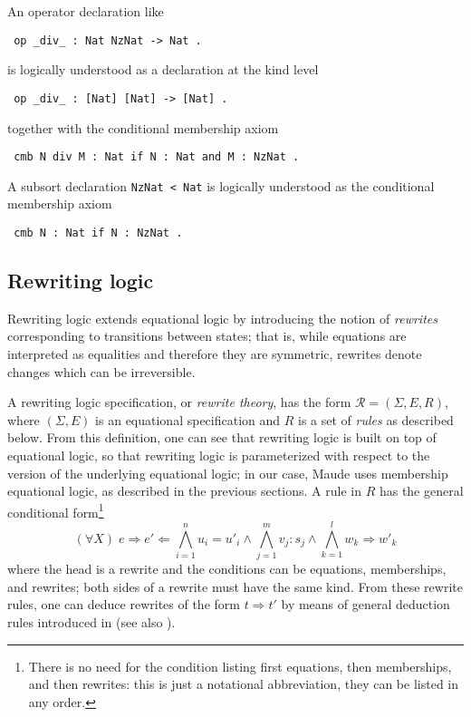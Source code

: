 An operator declaration like

{\codesize
\begin{verbatim}
 op _div_ : Nat NzNat -> Nat .
\end{verbatim}
}

\noindent
is logically understood as a declaration at the kind level

{\codesize
\begin{verbatim}
 op _div_ : [Nat] [Nat] -> [Nat] .
\end{verbatim}
}

\noindent
together with the conditional membership axiom

{\codesize
\begin{verbatim}
 cmb N div M : Nat if N : Nat and M : NzNat .
\end{verbatim}
}

A subsort declaration \texttt{NzNat < Nat} is logically understood as
the conditional membership axiom

{\codesize
\begin{verbatim}
 cmb N : Nat if N : NzNat .
\end{verbatim}
}

\subsection{Rewriting logic}

Rewriting logic extends equational logic by introducing the notion of \emph{rewrites} 
corresponding to
transitions between states; that is, while equations are interpreted as equalities and therefore
they are symmetric, rewrites denote changes which can be irreversible. 

A rewriting logic specification, or \emph{rewrite theory}, has the form
$\mathcal{R} = (\Sigma,E,R)$, where $(\Sigma,E)$ is an equational specification
and $R$ is a set of \emph{rules} as described below. From this definition,
one can see that rewriting logic is built on top of equational logic, so
that rewriting logic is parameterized
with respect to the version of the underlying equational logic; in our
case, Maude uses membership equational logic, as described in the
previous sections. A rule in $R$ has the general conditional
form\footnote{There is no need for the condition listing first equations,
then  memberships, and then rewrites: this is just a notational
abbreviation, they can be listed in any order.} 
\[
(\forall X) \; e \Rightarrow e' \Leftarrow \bigwedge_{i=1}^{n} u_i = u'_i \wedge
                      \bigwedge_{j=1}^{m}  v_j : s_j \wedge
                      \bigwedge_{k=1}^{l} w_k \Rightarrow w'_k
\]
where the head is a rewrite and the conditions can be equations,
memberships, and rewrites; both sides of a rewrite must have the same kind. 
From these rewrite rules, one can deduce rewrites of the form
$t \Rightarrow t'$ by means of general deduction rules introduced
in \cite{Meseguer92-tcs} (see also \cite{BruniMeseguer06}).

